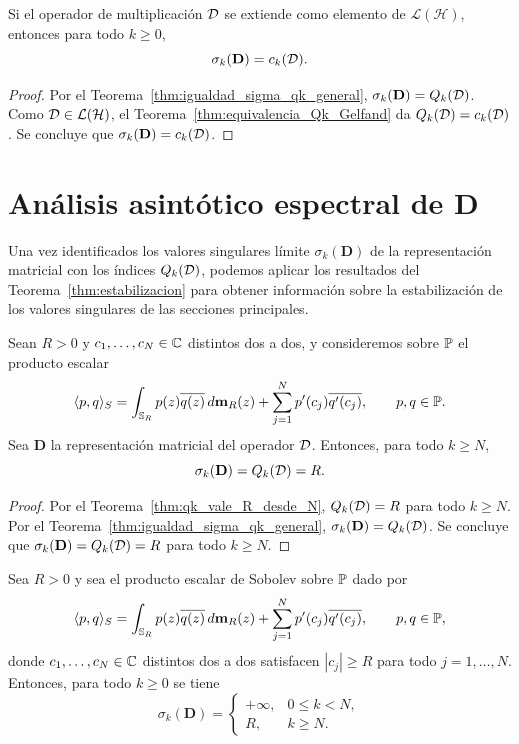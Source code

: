 \begin{cor}\label{cor:caso_acotado_ck}
	Si el operador de multiplicación \(\mathcal{D}\) se extiende como elemento de \(\mathcal L(\mathcal H)\), entonces para todo \(k\ge0\),
	\[
		\sigma_k(\mathbf D)=c_k(\mathcal{D}).
	\]
\end{cor}

\begin{proof}
	Por el Teorema~\ref{thm:igualdad_sigma_qk_general}, \(\sigma_k(\mathbf D)=Q_k(\mathcal{D})\). Como \(\mathcal{D}\in\mathcal L(\mathcal H)\), el Teorema~\ref{thm:equivalencia_Qk_Gelfand} da \(Q_k(\mathcal{D})=c_k(\mathcal{D})\). Se concluye que \(\sigma_k(\mathbf D)=c_k(\mathcal{D})\).
\end{proof}

\section{Análisis asintótico espectral de \texorpdfstring{$\mathbf D$}{D}}

Una vez identificados los valores singulares límite $\sigma_k(\mathbf D)$ de la representación matricial con los índices $Q_k(\mathcal{D})$, podemos aplicar los resultados del Teorema~\ref{thm:estabilizacion} para obtener información sobre la estabilización de los valores singulares de las secciones principales.

\begin{thm}\label{thm:igualdad_sigma_qN_general}
	Sean $R>0$ y $c_1,\dots,c_N\in\mathbb{C}$ distintos dos a dos, y consideremos sobre $\mathbb{P}$ el producto escalar
	\[
		\langle p,q\rangle_S
		=
		\int_{\mathbb{S}_R}p(z)\overline{q(z)}\,d\mathbf{m}_R(z)
		+
		\sum_{j=1}^N p'(c_j)\overline{q'(c_j)},
		\qquad p,q\in\mathbb{P}.
	\]
	Sea $\mathbf D$ la representación matricial del operador $\mathcal{D}$. Entonces, para todo $k\ge N$,
	\[
		\sigma_k(\mathbf D)=Q_k(\mathcal{D})=R.
	\]
\end{thm}

\begin{proof}
	Por el Teorema~\ref{thm:qk_vale_R_desde_N}, \(Q_k(\mathcal{D})=R\) para todo \(k\ge N\). Por el Teorema~\ref{thm:igualdad_sigma_qk_general}, \(\sigma_k(\mathbf D)=Q_k(\mathcal{D})\). Se concluye que \(\sigma_k(\mathbf D)=Q_k(\mathcal{D})=R\) para todo \(k\ge N\).
\end{proof}

\begin{cor}\label{cor:igualdad_sigma_qk_exterior_puro}
	Sea $R>0$ y sea el producto escalar de Sobolev sobre \(\mathbb{P}\) dado por
	\[
		\langle p,q\rangle_S
		=
		\int_{\mathbb{S}_R}p(z)\overline{q(z)}\,d\mathbf{m}_R(z)
		+
		\sum_{j=1}^N p'(c_j)\overline{q'(c_j)},
		\qquad p,q\in\mathbb{P},
	\]
	donde $c_1,\dots,c_N\in\mathbb{C}$ distintos dos a dos satisfacen $|c_j|\ge R$ para todo $j=1,\dots,N$. Entonces, para todo $k\ge 0$ se tiene
	\[
		\sigma_k(\mathbf D)
		=
		\begin{cases}
			+\infty, & 0\le k<N, \\
			R,       & k\ge N.
		\end{cases}
	\]
\end{cor}


